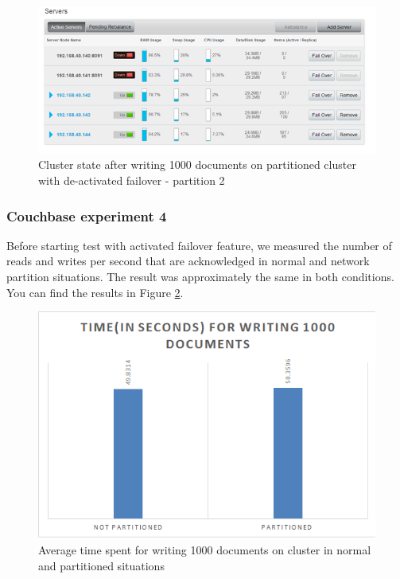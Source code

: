 \documentclass[a4paper]{article}
\begin{document}
\begin{figure}[h!]
	\centering
	\includegraphics[width=\textwidth]{diagram4}
	\caption{Cluster state after writing 1000 documents on partitioned cluster with de-activated failover - partition 2}
	\label{fig:diagram4}
\end{figure}

\subsubsection{Couchbase experiment 4} 
Before starting test with activated failover feature, we measured the number of reads and writes per second that are acknowledged in normal and network partition situations.
The result was approximately the same in both conditions.
You can find the results in Figure \ref{fig:diagram5}.
\begin{figure}[h!]
	\centering
	\includegraphics[width=\textwidth]{diagram5}
	\caption{Average time spent for writing 1000 documents on cluster in normal and partitioned situations}
	\label{fig:diagram5}
\end{figure}
\end{document}
